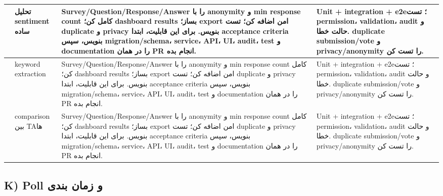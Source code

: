 \documentclass[11pt,a4paper]{article}
\begin{document}
\begin{longtable}{|>{\raggedleft\arraybackslash}p{}|>{\raggedleft\arraybackslash}p{}|>{\raggedleft\arraybackslash}p{}|>{\raggedleft\arraybackslash}p{}|}
178 & تحلیل sentiment ساده & Survey/Question/Response/Answer را با anonymity و min response count کامل کن؛ dashboard results بساز؛ export امن اضافه کن؛ تست duplicate و privacy بنویس. برای این قابلیت، ابتدا acceptance criteria بنویس، سپس migration/schema، service، API، UI، audit، test و documentation را در همان PR انجام بده. & Unit + integration + e2e؛ تست permission، validation، audit و حالت خطا. duplicate submission/vote و privacy/anonymity را تست کن. \\ \hline
179 & keyword extraction & Survey/Question/Response/Answer را با anonymity و min response count کامل کن؛ dashboard results بساز؛ export امن اضافه کن؛ تست duplicate و privacy بنویس. برای این قابلیت، ابتدا acceptance criteria بنویس، سپس migration/schema، service، API، UI، audit، test و documentation را در همان PR انجام بده. & Unit + integration + e2e؛ تست permission، validation، audit و حالت خطا. duplicate submission/vote و privacy/anonymity را تست کن. \\ \hline
180 & comparison بین TAها & Survey/Question/Response/Answer را با anonymity و min response count کامل کن؛ dashboard results بساز؛ export امن اضافه کن؛ تست duplicate و privacy بنویس. برای این قابلیت، ابتدا acceptance criteria بنویس، سپس migration/schema، service، API، UI، audit، test و documentation را در همان PR انجام بده. & Unit + integration + e2e؛ تست permission، validation، audit و حالت خطا. duplicate submission/vote و privacy/anonymity را تست کن. \\ \hline
\end{longtable}
\subsection{K) Poll و زمان بندی}
\end{document}
